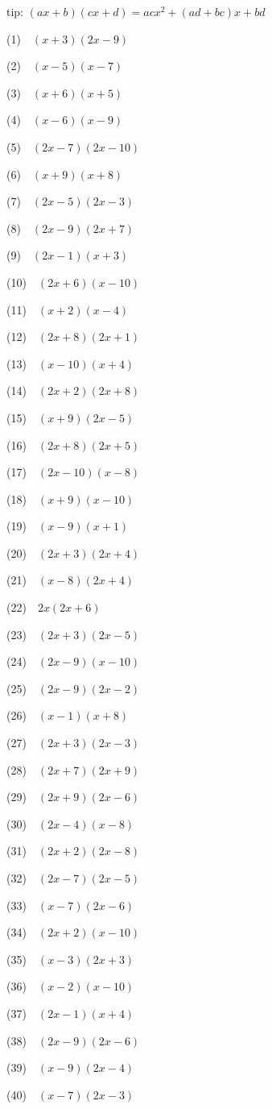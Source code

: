 \documentclass[a4j,10pt,fleqn]{jarticle}
\begin{document}
tip: $(ax + b)(cx + d) = acx^2 + (ad + bc)x + bd$

(1)~~$(x+3)(2x-9)$

(2)~~$(x-5)(x-7)$

(3)~~$(x+6)(x+5)$

(4)~~$(x-6)(x-9)$

(5)~~$(2x-7)(2x-10)$

(6)~~$(x+9)(x+8)$

(7)~~$(2x-5)(2x-3)$

(8)~~$(2x-9)(2x+7)$

(9)~~$(2x-1)(x+3)$

(10)~~$(2x+6)(x-10)$

(11)~~$(x+2)(x-4)$

(12)~~$(2x+8)(2x+1)$

(13)~~$(x-10)(x+4)$

(14)~~$(2x+2)(2x+8)$

(15)~~$(x+9)(2x-5)$

(16)~~$(2x+8)(2x+5)$

(17)~~$(2x-10)(x-8)$

(18)~~$(x+9)(x-10)$

(19)~~$(x-9)(x+1)$

(20)~~$(2x+3)(2x+4)$

(21)~~$(x-8)(2x+4)$

(22)~~$2x(2x+6)$

(23)~~$(2x+3)(2x-5)$

(24)~~$(2x-9)(x-10)$

(25)~~$(2x-9)(2x-2)$

(26)~~$(x-1)(x+8)$

(27)~~$(2x+3)(2x-3)$

(28)~~$(2x+7)(2x+9)$

(29)~~$(2x+9)(2x-6)$

(30)~~$(2x-4)(x-8)$

(31)~~$(2x+2)(2x-8)$

(32)~~$(2x-7)(2x-5)$

(33)~~$(x-7)(2x-6)$

(34)~~$(2x+2)(x-10)$

(35)~~$(x-3)(2x+3)$

(36)~~$(x-2)(x-10)$

(37)~~$(2x-1)(x+4)$

(38)~~$(2x-9)(2x-6)$

(39)~~$(x-9)(2x-4)$

(40)~~$(x-7)(2x-3)$
\end{document}
